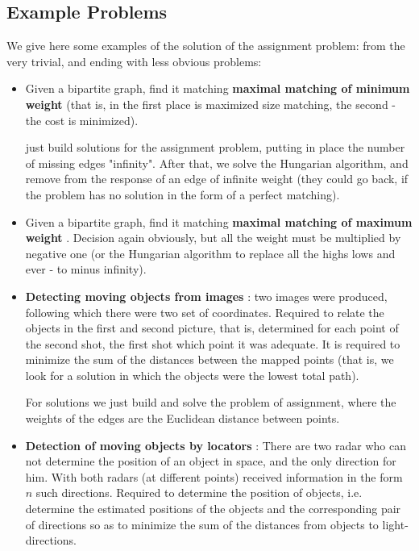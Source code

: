 \subsection{ Example Problems }

We give here some examples of the solution of the assignment problem: from the very trivial, and ending with less obvious problems:

\begin{itemize}

\item Given a bipartite graph, find it matching \textbf{ maximal matching of minimum weight } (that is, in the first place is maximized size matching, the second - the cost is minimized).

just build solutions for the assignment problem, putting in place the number of missing edges "infinity". After that, we solve the Hungarian algorithm, and remove from the response of an edge of infinite weight (they could go back, if the problem has no solution in the form of a perfect matching).

\item Given a bipartite graph, find it matching \textbf{ maximal matching of maximum weight }. Decision again obviously, but all the weight must be multiplied by negative one (or the Hungarian algorithm to replace all the highs lows and ever - to minus infinity).

\item \textbf{Detecting moving objects from images }: two images were produced, following which there were two set of coordinates. Required to relate the objects in the first and second picture, that is, determined for each point of the second shot, the first shot which point it was adequate. It is required to minimize the sum of the distances between the mapped points (that is, we look for a solution in which the objects were the lowest total path).

For solutions we just build and solve the problem of assignment, where the weights of the edges are the Euclidean distance between points.

\item \textbf{Detection of moving objects by locators }: There are two radar who can not determine the position of an object in space, and the only direction for him. With both radars (at different points) received information in the form $n$ such directions. Required to determine the position of objects, i.e. determine the estimated positions of the objects and the corresponding pair of directions so as to minimize the sum of the distances from objects to light-directions.


\end{itemize}

